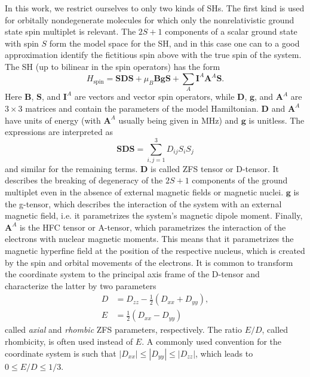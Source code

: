 In this work, we restrict ourselves to only two kinds of SHs. The first kind is used for orbitally nondegenerate molecules for which only the nonrelativistic ground state spin multiplet is relevant. The $2S+1$ components of a scalar ground state with spin $S$ form the model space for the SH, and in this case one can to a good approximation identify the fictitious spin above with the true spin of the system. The SH (up to bilinear in the spin operators) has the form
\begin{equation}
\label{Eq:SpinHamilIntrinsic}
H_\text{spin} = \mathbf{S}\mathbf{D} \mathbf{S} + \mu_B \mathbf{B}\mathbf{g}\mathbf{S} + \sum_A \mathbf{I}^A \mathbf{A}^A \mathbf{S}.
\end{equation}
Here  $\mathbf{B}$, $\mathbf{S}$, and $\mathbf{I}^A$ are vectors and vector spin operators, while $\mathbf{D}$, $\mathbf{g}$, and $\mathbf{A}^A$ are $3\times 3$ matrices and contain the parameters of the model Hamiltonian. $\mathbf{D}$ and $\mathbf{A}^A$ have units of energy (with $\mathbf{A}^A$ usually being given in MHz) and $\mathbf{g}$ is unitless. The expressions are interpreted as
\begin{equation}
\mathbf{S} \mathbf{D} \mathbf{S} = \sum_{i,j=1}^3 D_{ij} S_i S_j
\end{equation}
and similar for the remaining terms. $\mathbf{D}$ is called ZFS tensor or D-tensor. It describes the breaking of degeneracy of the $2S+1$ components of the ground multiplet even in the absence of external magnetic fields or magnetic nuclei. $\mathbf{g}$ is the g-tensor, which describes the interaction of the system with an external magnetic field, i.e. it parametrizes the system's magnetic dipole moment. Finally, $\mathbf{A}^A$ is the HFC tensor or A-tensor, which parametrizes the interaction of the electrons with nuclear magnetic moments. This means that it parametrizes the magnetic hyperfine field at the position of the respective nucleus, which is created by the spin and orbital movements of the electrons. It is common to transform the coordinate system to the principal axis frame of the D-tensor and characterize the latter by two parameters
\begin{align}
D &= D_{zz}-\frac{1}{2}(D_{xx}+ D_{yy}), \\
E &= \frac{1}{2}(D_{xx} - D_{yy})
\end{align}
called \emph{axial} and \emph{rhombic} ZFS parameters, respectively. The ratio $E/D$, called rhombicity, is often used instead of $E$. A commonly used convention for the coordinate system is such that $|D_{xx}|\leq|D_{yy}|\leq|D_{zz}|$, which leads to $0 \leq E/D \leq 1/3$.

